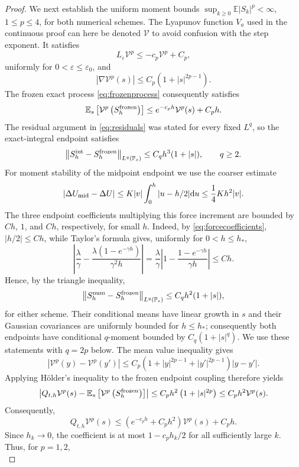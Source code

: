 \documentclass[11pt]{article}
\theoremstyle{definition}
\newcommand{\E}{\mathbb E}
\newcommand{\dd}{\mathrm d}
\newcommand{\eps}{\varepsilon}
\begin{document}
\begin{proof}
We next establish the uniform moment bounds
$\sup_{k\geq0}\E|S_k|^p<\infty$, $1\leq p\leq4$, for both numerical schemes.
The Lyapunov function $V_a$ used in the continuous proof can here be denoted
$\mathcal V$ to avoid confusion with the step exponent. It satisfies
\[
L_\eps\mathcal V^p\leq-c_p\mathcal V^p+C_p, 
\]
uniformly for
$0<\eps\leq\eps_0$, and
\[
|\nabla\mathcal V^p(s)|\leq C_p\left(1+|s|^{2p-1}\right).
\]
The frozen exact process \eqref{eq:frozenprocess} consequently satisfies
\[
 \E_s\left[\mathcal V^p\left(S_h^{\rm frozen}\right)\right]
 \leq e^{-c_ph}\mathcal V^p(s)+C_ph.
\]
The residual argument in \eqref{eq:residuals} was stated for every fixed
$L^q$, so the exact-integral endpoint satisfies
\[
 \left\|S_h^{\rm int}-S_h^{\rm frozen}\right\|_{L^q(\mathbb P_s)}
 \leq C_qh^3(1+|s|),\qquad q\geq2.
\]
For moment stability of the midpoint endpoint we use the coarser estimate
\[
 |\Delta U_{\rm mid}-\Delta U|
 \leq K|v|\int_0^h|u-h/2|\dd u
 \leq \frac14Kh^2|v|.
\]
The three endpoint coefficients multiplying this force increment are bounded
by $Ch$, $1$, and $Ch$, respectively, for small $h$.
Indeed, by \eqref{eq:forcecoefficients},
$\left|h/2\right|\leq Ch$, 
while Taylor's formula gives, uniformly for $0<h\leq h_*$,
\[
 \left|\frac\lambda\gamma
 -\frac{\lambda(1-e^{-\gamma h})}{\gamma^2h}\right|
 =\frac\lambda\gamma
 \left|1-\frac{1-e^{-\gamma h}}{\gamma h}\right|
 \leq Ch.
\]
Hence, by the triangle inequality,
\begin{equation}\label{eq:coarsemomentlocal}
 \left\|S_h^{\rm num}-S_h^{\rm frozen}\right\|_{L^q(\mathbb P_s)}
 \leq C_qh^2(1+|s|),
\end{equation}
for either scheme. Their conditional means have linear growth in $s$ and their
Gaussian covariances are uniformly bounded for $h\leq h_*$; consequently both
endpoints have conditional $q$-moment bounded by $C_q(1+|s|^q)$.
We use these statements with $q=2p$ below.
The mean value inequality gives
\[
 \left|\mathcal V^p(y)-\mathcal V^p(y')\right|
 \leq C_p\left(1+|y|^{2p-1}+|y'|^{2p-1}\right)|y-y'|.
\]
Applying H\"older's inequality to the frozen endpoint coupling therefore yields
\[
 \left|Q_{t,h}\mathcal V^p(s)
       -\E_s\left[\mathcal V^p\left(S_h^{\rm frozen}\right)\right]\right|
 \leq C_ph^2\left(1+|s|^{2p}\right)
 \leq C_ph^2\mathcal V^p(s).
\]
Consequently,
\[
 Q_{t,h}\mathcal V^p(s)
 \leq \left(e^{-c_ph}+C_ph^2\right)\mathcal V^p(s)+C_ph.
\]
Since $h_k\to0$, the coefficient is at most $1-c_ph_k/2$ for all sufficiently
large $k$. Thus, for $p=1,2$,
\begin{equation}\label{eq:discrete-lyapunov-recursion}

\end{equation}
\end{proof}
\end{document}
